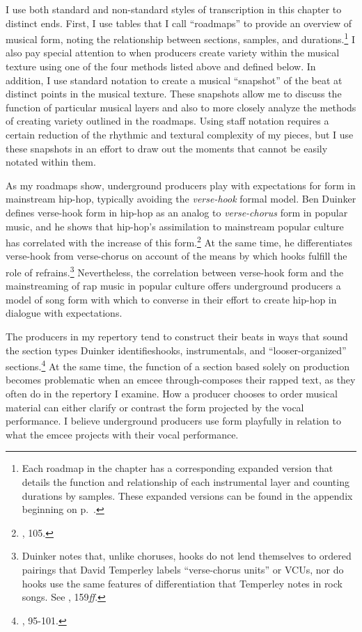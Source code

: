 I use both standard and non-standard styles of transcription in this chapter to distinct ends. First, I use tables that I call ``roadmaps'' to provide an overview of musical form, noting the relationship between sections, samples, and durations.\footnote{Each roadmap in the chapter has a corresponding expanded version that details the function and relationship of each instrumental layer and counting durations by samples. These expanded versions can be found in the appendix beginning on p.~\pageref{appendix:fullroadmaps}.} I also pay special attention to when producers create variety within the musical texture using one of the four methods listed above and defined below. In addition, I use standard notation to create a musical ``snapshot'' of the beat at distinct points in the musical texture. These snapshots allow me to discuss the function of particular musical layers and also to more closely analyze the methods of creating variety outlined in the roadmaps. Using staff notation requires a certain reduction of the rhythmic and textural complexity of my pieces, but I use these snapshots in an effort to draw out the moments that cannot be easily notated within them.

As my roadmaps show, underground producers play with expectations for form in mainstream hip-hop, typically avoiding the \emph{verse-hook} formal model. Ben Duinker defines verse-hook form in hip-hop as an analog to \emph{verse-chorus} form in popular music, and he shows that hip-hop's assimilation to mainstream popular culture has correlated with the increase of this form.\footnote{\cite{benduinkerSongFormMainstreaming2020}, 105.} At the same time, he differentiates verse-hook from verse-chorus on account of the means by which hooks fulfill the role of refrains.\footnote{Duinker notes that, unlike choruses, hooks do not lend themselves to ordered pairings that David Temperley labels ``verse-chorus units'' or VCUs, nor do hooks use the same features of differentiation that Temperley notes in rock songs. See \cite{davidtemperleyMusicalLanguageRock2018}, 159\textit{ff}.} Nevertheless, the correlation between verse-hook form and the mainstreaming of rap music in popular culture offers underground producers a model of song form with which to converse in their effort to create hip-hop in dialogue with expectations.

The producers in my repertory tend to construct their beats in ways that sound the section types Duinker identifies\textemdash  hooks, instrumentals, and ``looser-organized'' sections.\footnote{\cite{benduinkerSongFormMainstreaming2020}, 95-101.} At the same time, the function of a section based solely on production becomes problematic when an emcee through-composes their rapped text, as they often do in the repertory I examine. How a producer chooses to order musical material can either clarify or contrast the form projected by the vocal performance. I believe underground producers use form playfully in relation to what the emcee projects with their vocal performance.

